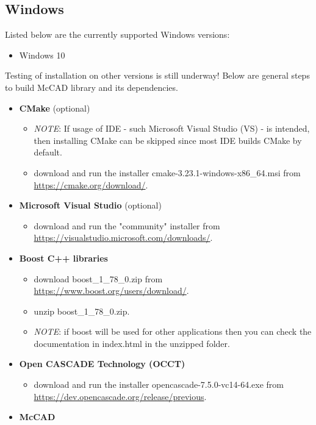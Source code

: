 \documentclass[12pt, a4paper, titlepage]{article}
\begin{document}
  \subsection{Windows}
    Listed below are the currently supported Windows versions:
    \begin{itemize}
  	  \item Windows 10
    \end{itemize} 
    Testing of installation on other versions is still underway! Below are general steps to build McCAD library and its dependencies.
    \begin{itemize}
	  \item \textbf{CMake} (optional)
 	  \begin{itemize}
    	\item \emph{NOTE}: If usage of IDE - such Microsoft Visual Studio (VS) - is intended, then installing CMake can be skipped since most IDE builds CMake by default.
 		\item download and run the installer cmake-3.23.1-windows-x86\_64.msi from \url{https://cmake.org/download/}.
  	  \end{itemize}
	  \item \textbf{Microsoft Visual Studio} (optional)
	  \begin{itemize}
		\item download and run the "community" installer from \\\url{https://visualstudio.microsoft.com/downloads/}.
	  \end{itemize}
      \item \textbf{Boost C++ libraries}
      \begin{itemize}
    	\item download boost\_1\_78\_0.zip from \url{https://www.boost.org/users/download/}.
    	\item unzip boost\_1\_78\_0.zip.
    	\item \emph{NOTE}: if boost will be used for other applications then you can check the documentation in index.html in the unzipped folder.
      \end{itemize}
      \item \textbf{Open CASCADE Technology (OCCT)}
	  \begin{itemize}
		\item download and run the installer opencascade-7.5.0-vc14-64.exe from \url{https://dev.opencascade.org/release/previous}.
	  \end{itemize}
	  \item \textbf{McCAD}

\end{itemize}
\end{document}
